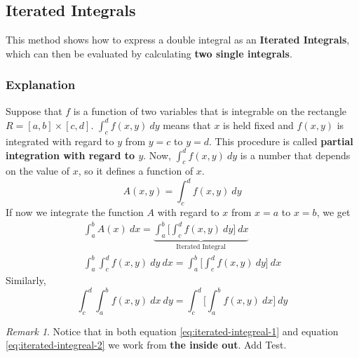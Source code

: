 \documentclass[math,code]{amznotes}
\theoremstyle{remark}
\newtheorem*{remark}{Remark}
\begin{document}
\subsection{Iterated Integrals}
This method shows how to express a double integral as an {\color{red} \textbf{Iterated Integrals}}, which can then be evaluated by calculating \textbf{two single integrals}.
\subsubsection{Explanation}
Suppose that $f$ is a function of two variables that is integrable on the rectangle $R=[a,b]\times[c,d]$. $\int_{c}^{d}f(x,y)~dy$ means that $x$ is held fixed and $f(x,y)$ is integrated with regard to $y$ from $y=c$ to $y=d$. This procedure is called {\color{red} \textbf{partial integration with regard to $y$}}. Now, $\int_{c}^{d}f(x,y)~dy$ is a number that depends on the value of $x$, so it defines a function of $x$.
\begin{displaymath}
    A(x,y)=\int_{c}^{d}f(x,y)~dy
\end{displaymath}
If now we integrate the function $A$ with regard to $x$ from $x=a$ to $x=b$, we get
\begin{gather}
    \int_a^bA(x)~dx=\underbrace{\int_a^b\Bigg[\int_c^df(x,y)~dy\Bigg]~dx}_\text{Iterated Integral} \\
    \int_a^b\int_c^df(x,y)~dy~dx = \int_a^b\Bigg[\int_c^df(x,y)~dy\Bigg]~dx \label{eq:iterated-integreal-1}
\end{gather}
Similarly,
\begin{equation} \label{eq:iterated-integreal-2}
    \int_c^d\int_a^bf(x,y)~dx~dy = \int_c^d\Bigg[\int_a^bf(x,y)~dx\Bigg]~dy
\end{equation}
\begin{notebox}
    \begin{remark}
        Notice that in both equation \eqref{eq:iterated-integreal-1} and equation \eqref{eq:iterated-integreal-2} we work from \textbf{the inside out}. Add Test.
    \end{remark}
\end{notebox}
\end{document}
